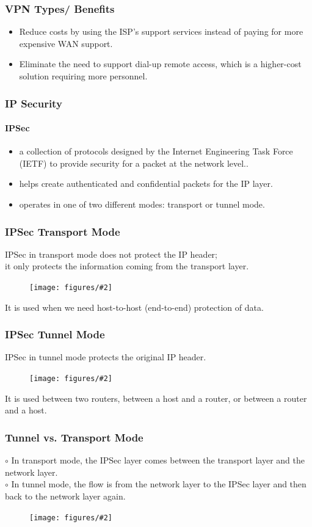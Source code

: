 \documentclass{beamer}
\newcommand{\fig}[2]{
\begin{center}
\begin{figure}
\texttt{[image: figures/\#2]}
\end{figure}
\end{center}
}
\begin{document}
\begin{frame}
\frametitle{\huge VPN Types/ Benefits}
\Large
\begin{itemize} 
\item <1-> Reduce costs by using the ISP's support services instead of paying for more expensive WAN support.
\item <2-> Eliminate the need to support dial-up remote access, which is a higher-cost solution requiring more personnel.
\end{itemize}
\end{frame}


\begin{frame}
\frametitle{\huge IP Security}
\framesubtitle{IPSec}
\Large
\begin{itemize} 
\item <1-> a collection of protocols designed by the Internet Engineering Task Force (IETF) to provide security for a packet at the network level..
\item <2-> helps create authenticated and confidential packets for the IP layer.
\item <3-> operates in one of two different modes: transport or tunnel mode.
\end{itemize}
\end{frame}


\begin{frame}
\frametitle{\huge IPSec Transport Mode}
\Large
IPSec in transport mode does not protect the IP header;\\ it only protects the information coming from the transport layer.
\fig{0.5}{network_ipsectrans}
It is used when we need host-to-host (end-to-end) protection of data.
\end{frame}


\begin{frame}
\frametitle{\huge IPSec Tunnel Mode}
\Large
IPSec in tunnel mode protects the original IP header.
\fig{0.5}{network_ipsectunnel}
It is used between two routers, between a host and a router, or between a router and a host.
\end{frame}


\begin{frame}
\frametitle{\huge Tunnel vs. Transport Mode}
\Large
$\circ$ In transport mode, the IPSec layer comes between the transport layer and the network layer. \\
$\circ$ In tunnel mode, the flow is from the network layer to the IPSec layer and then back to the network layer again.
\fig{0.5}{network_tunnelvstrans}
\end{frame}
\end{document}
